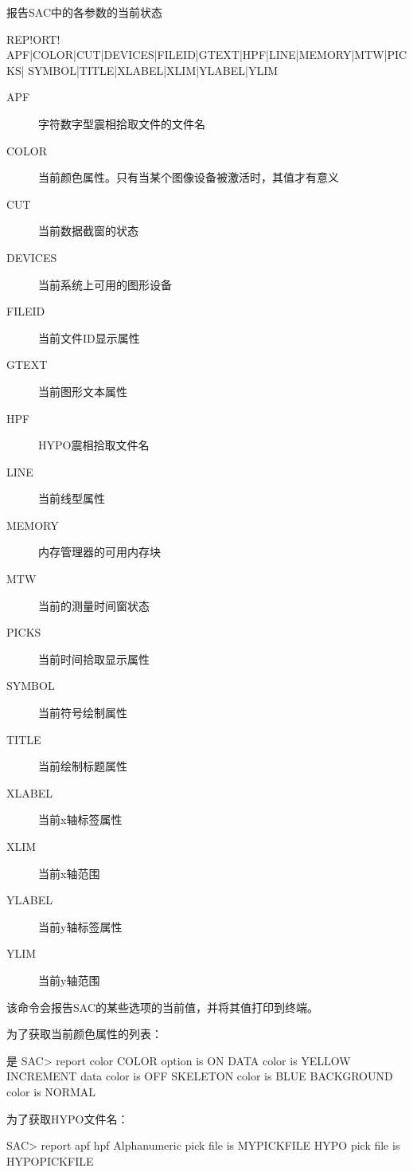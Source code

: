 \label{cmd:report}

报告SAC中的各参数的当前状态

\begin{SACSTX}
REP!ORT! APF|COLOR|CUT|DEVICES|FILEID|GTEXT|HPF|LINE|MEMORY|MTW|PICKS|
    SYMBOL|TITLE|XLABEL|XLIM|YLABEL|YLIM
\end{SACSTX}

\begin{description}
\item [APF] 字符数字型震相拾取文件的文件名
\item [COLOR] 当前颜色属性。只有当某个图像设备被激活时，其值才有意义
\item [CUT] 当前数据截窗的状态
\item [DEVICES] 当前系统上可用的图形设备
\item [FILEID] 当前文件ID显示属性
\item [GTEXT] 当前图形文本属性
\item [HPF] HYPO震相拾取文件名
\item [LINE] 当前线型属性
\item [MEMORY] 内存管理器的可用内存块
\item [MTW] 当前的测量时间窗状态
\item [PICKS] 当前时间拾取显示属性
\item [SYMBOL] 当前符号绘制属性
\item [TITLE] 当前绘制标题属性
\item [XLABEL] 当前x轴标签属性
\item [XLIM] 当前x轴范围
\item [YLABEL] 当前y轴标签属性
\item [YLIM] 当前y轴范围
\end{description}

该命令会报告SAC的某些选项的当前值，并将其值打印到终端。

为了获取当前颜色属性的列表：
\begin{SACCode}是
SAC> report color
 COLOR option is ON
 DATA color is YELLOW
 INCREMENT data color is OFF
 SKELETON color is BLUE
 BACKGROUND color is NORMAL
\end{SACCode}

为了获取HYPO文件名：
\begin{SACCode}
SAC> report apf hpf
 Alphanumeric pick file is MYPICKFILE
 HYPO pick file is HYPOPICKFILE
\end{SACCode}
